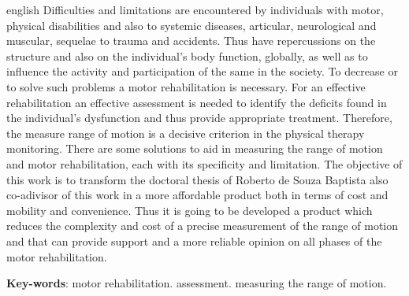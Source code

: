 \begin{resumo}[Abstract]
 \begin{otherlanguage*}{english}
Difficulties and limitations are encountered by individuals with motor, physical 
disabilities and also to systemic diseases, articular, neurological and muscular,
 sequelae to trauma and accidents. Thus have repercussions on the structure and
 also on the individual's body function, globally, as well as to influence the 
activity and  participation of the same in the society. To decrease or to solve such problems
 a motor rehabilitation is necessary. For an effective rehabilitation an effective
 assessment is needed to identify the deficits found in the individual's dysfunction
 and thus provide appropriate treatment. Therefore, the measure range of motion
 is a decisive criterion in the physical therapy monitoring. There are some solutions
 to aid in measuring the range of motion and motor rehabilitation, each with its
 specificity and limitation. The objective of this work is to transform the doctoral
 thesis of Roberto de Souza Baptista also co-adivisor of this work in a more affordable
 product both in terms of cost and mobility and convenience. Thus it is going to be developed
 a product which reduces the complexity and cost of a precise measurement of the
 range of motion and that can provide support and a more reliable opinion
 on all phases of the motor rehabilitation.
   \vspace{\onelineskip}
 
   \noindent 
   \textbf{Key-words}: motor rehabilitation. assessment. measuring the range of motion.
 \end{otherlanguage*}
\end{resumo}
